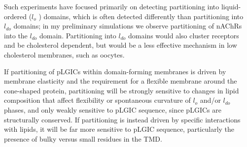 \documentclass{article}
\begin{document}
Such experiments have focused primarily on detecting partitioning into liquid-ordered ($l_o$ ) domains, which is often detected differently than partitioning into $l_{do}$ domains; in my preliminary simulations we observe partitioning of nAChRs into the $l_{do}$ domain. Partitioning into $l_{do}$ domains would also cluster receptors and be cholesterol dependent, but would be a less effective mechanism in low cholesterol membranes, such as oocytes.






If partitioning of pLGICs within domain-forming membranes is driven by membrane elasticity and the requirement for a flexible membrane around the cone-shaped protein, partitioning will be strongly sensitive to changes in lipid composition that affect flexibility or spontaneous curvature of $l_o$ and/or $l_{do}$ phases, and only weakly sensitive to pLGIC sequence, since pLGICs are structurally conserved. If partitioning is instead driven by specific interactions with lipids, it will be far more sensitive to pLGIC sequence, particularly the presence of bulky versus small residues in the TMD. 
\end{document}
